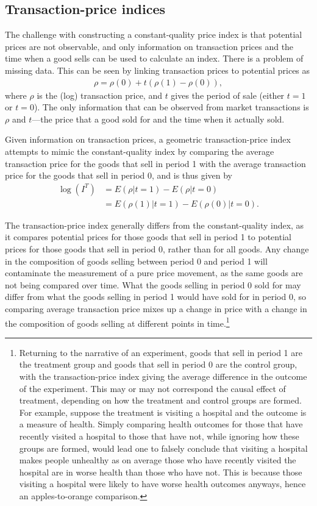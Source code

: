\documentclass[
]{article}
\begin{document}
\hypertarget{transaction-price-indices}{%
\subsection{Transaction-price indices}\label{transaction-price-indices}}

The challenge with constructing a constant-quality price index is that potential prices are not observable, and only information on transaction prices and the time when a good sells can be used to calculate an index. There is a problem of missing data. This can be seen by linking transaction prices to potential prices as
\begin{align*}
\rho = \rho(0) + t(\rho(1) - \rho(0)),
\end{align*}
where \(\rho\) is the (log) transaction price, and \(t\) gives the period of sale (either \(t = 1\) or \(t = 0\)). The only information that can be observed from market transactions is \(\rho\) and \(t\)---the price that a good sold for and the time when it actually sold.

Given information on transaction prices, a geometric transaction-price index attempts to mimic the constant-quality index by comparing the average transaction price for the goods that sell in period 1 with the average transaction price for the goods that sell in period 0, and is thus given by
\begin{align*}
\log(I^{T}) &= E(\rho | t = 1) - E(\rho | t = 0) \\
&= E(\rho(1) | t = 1) - E(\rho(0) | t = 0).
\end{align*}

The transaction-price index generally differs from the constant-quality index, as it compares potential prices for those goods that sell in period 1 to potential prices for those goods that sell in period 0, rather than for all goods. Any change in the composition of goods selling between period 0 and period 1 will contaminate the measurement of a pure price movement, as the same goods are not being compared over time. What the goods selling in period 0 sold for may differ from what the goods selling in period 1 would have sold for in period 0, so comparing average transaction price mixes up a change in price with a change in the composition of goods selling at different points in time.\footnote{Returning to the narrative of an experiment, goods that sell in period 1 are the treatment group and goods that sell in period 0 are the control group, with the transaction-price index giving the average difference in the outcome of the experiment. This may or may not correspond the causal effect of treatment, depending on how the treatment and control groups are formed. For example, suppose the treatment is visiting a hospital and the outcome is a measure of health. Simply comparing health outcomes for those that have recently visited a hospital to those that have not, while ignoring how these groups are formed, would lead one to falsely conclude that visiting a hospital makes people unhealthy as on average those who have recently visited the hospital are in worse health than those who have not. This is because those visiting a hospital were likely to have worse health outcomes anyways, hence an apples-to-orange comparison.}
\end{document}

